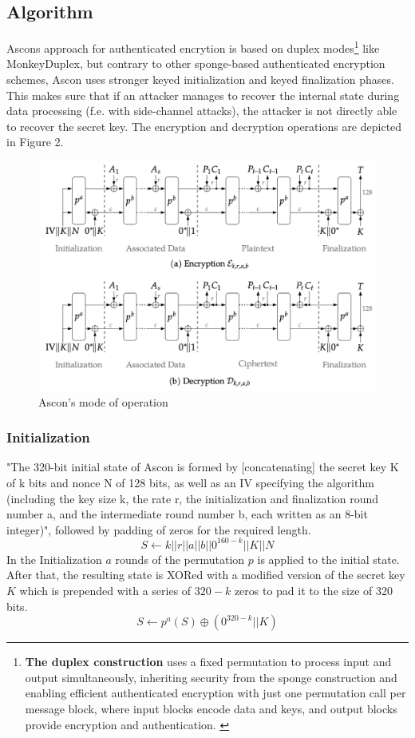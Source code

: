 \subsection{Algorithm} %
\sloppy
Ascons approach for authenticated encrytion is based on duplex modes\footnote[3]{\textbf{The duplex construction} uses a fixed permutation to process input and output simultaneously, inheriting security from the sponge construction and enabling efficient authenticated encryption with just one permutation call per message block, where input blocks encode data and keys, and output blocks provide encryption and authentication. \cite{10.1007/978-3-642-28496-0_19}} like MonkeyDuplex, but contrary to other sponge-based authenticated encryption schemes, Ascon uses stronger keyed initialization and keyed finalization phases. This makes sure that if an attacker manages to recover the internal state during data processing (f.e. with side-channel attacks), the attacker is not directly able to recover the secret key. \cite[Chapter 5.1]{Ascon-v1.2}
The encryption and decryption operations are depicted in Figure 2. \cite{Ascon-v1.2}
\begin{figure}[H]
    \centering
    \includegraphics[width=1\textwidth]{figures/aead-algorithm.png}
    \caption{Ascon's mode of operation \cite{Ascon-v1.2}}
    \label{fig:aead-algorithm}
\end{figure}
\subsubsection{Initialization}

"The 320-bit initial state of Ascon is formed by [concatenating] the secret key K of k bits and nonce N of 128 bits, as well as an IV specifying the algorithm (including the key size k, the rate r, the initialization and finalization round number a, and the intermediate round number b, each written as an 8-bit integer)", followed by padding of zeros for the required length.
$$S \leftarrow k || r || a || b || 0^{160-k} || K || N $$
In the Initialization $a$ rounds of the permutation $p$ is applied to the initial state. After that, the resulting state is XORed with a modified version of the secret key $K$ which is prepended with a series of $320-k$ zeros to pad it to the size of 320 bits. \cite{Ascon-v1.2}
$$S \leftarrow p^a(S) \oplus (0^{320-k} || K)$$
